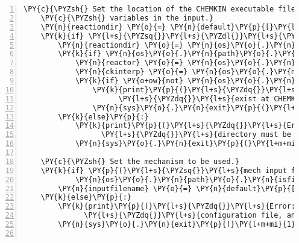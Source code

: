 \begin{Verbatim}[commandchars=\\\{\},fontsize=\small,numbers=left,firstnumber=1,stepnumber=2,firstline=2]
    \PY{c}{\PYZsh{} Set the location of the CHEMKIN executable files. Expand any shell}
    \PY{c}{\PYZsh{} variables in the input.}
    \PY{n}{reactiondir} \PY{o}{=} \PY{n}{default}\PY{p}{[}\PY{l+s}{\PYZsq{}}\PY{l+s}{chemkin root}\PY{l+s}{\PYZsq{}}\PY{p}{]}
    \PY{k}{if} \PY{l+s}{\PYZsq{}}\PY{l+s}{\PYZdl{}}\PY{l+s}{\PYZsq{}} \PY{o+ow}{in} \PY{n}{reactiondir}\PY{p}{:}
        \PY{n}{reactiondir} \PY{o}{=} \PY{n}{os}\PY{o}{.}\PY{n}{path}\PY{o}{.}\PY{n}{expandvars}\PY{p}{(}\PY{n}{reactiondir}\PY{p}{)}
        \PY{k}{if} \PY{n}{os}\PY{o}{.}\PY{n}{path}\PY{o}{.}\PY{n}{isdir}\PY{p}{(}\PY{n}{reactiondir}\PY{p}{)}\PY{p}{:}
            \PY{n}{reactor} \PY{o}{=} \PY{n}{os}\PY{o}{.}\PY{n}{path}\PY{o}{.}\PY{n}{join}\PY{p}{(}\PY{n}{reactiondir}\PY{p}{,}\PY{l+s}{\PYZsq{}}\PY{l+s}{bin}\PY{l+s}{\PYZsq{}}\PY{p}{,}\PY{l+s}{\PYZsq{}}\PY{l+s}{CKReactorGenericClosed}\PY{l+s}{\PYZsq{}}\PY{p}{)}
            \PY{n}{ckinterp} \PY{o}{=} \PY{n}{os}\PY{o}{.}\PY{n}{path}\PY{o}{.}\PY{n}{join}\PY{p}{(}\PY{n}{reactiondir}\PY{p}{,}\PY{l+s}{\PYZsq{}}\PY{l+s}{bin}\PY{l+s}{\PYZsq{}}\PY{p}{,}\PY{l+s}{\PYZsq{}}\PY{l+s}{chem}\PY{l+s}{\PYZsq{}}\PY{p}{)}
            \PY{k}{if} \PY{o+ow}{not} \PY{n}{os}\PY{o}{.}\PY{n}{path}\PY{o}{.}\PY{n}{isfile}\PY{p}{(}\PY{n}{reactor}\PY{p}{)} \PY{o+ow}{or} \PY{o+ow}{not} \PY{n}{os}\PY{o}{.}\PY{n}{path}\PY{o}{.}\PY{n}{isfile}\PY{p}{(}\PY{n}{ckinterp}\PY{p}{)}\PY{p}{:}
                \PY{k}{print}\PY{p}{(}\PY{l+s}{\PYZdq{}}\PY{l+s}{Error: The reactor and CHEMKIN interpreter must }\PY{l+s}{\PYZdq{}}
                      \PY{l+s}{\PYZdq{}}\PY{l+s}{exist at CHEMKIN\PYZus{}ROOT/bin/}\PY{l+s}{\PYZdq{}}\PY{p}{)}
                \PY{n}{sys}\PY{o}{.}\PY{n}{exit}\PY{p}{(}\PY{l+m+mi}{1}\PY{p}{)}
        \PY{k}{else}\PY{p}{:}
            \PY{k}{print}\PY{p}{(}\PY{l+s}{\PYZdq{}}\PY{l+s}{Error: The proper path to the CHEMKIN root }\PY{l+s}{\PYZdq{}}
                  \PY{l+s}{\PYZdq{}}\PY{l+s}{directory must be specified}\PY{l+s}{\PYZdq{}}\PY{p}{)}
            \PY{n}{sys}\PY{o}{.}\PY{n}{exit}\PY{p}{(}\PY{l+m+mi}{1}\PY{p}{)}

    \PY{c}{\PYZsh{} Set the mechanism to be used.}
    \PY{k}{if} \PY{p}{(}\PY{l+s}{\PYZsq{}}\PY{l+s}{mech input file}\PY{l+s}{\PYZsq{}} \PY{o+ow}{in} \PY{n}{default} \PY{o+ow}{and}
            \PY{n}{os}\PY{o}{.}\PY{n}{path}\PY{o}{.}\PY{n}{isfile}\PY{p}{(}\PY{n}{default}\PY{p}{[}\PY{l+s}{\PYZsq{}}\PY{l+s}{mech input file}\PY{l+s}{\PYZsq{}}\PY{p}{]}\PY{p}{)}\PY{p}{)}\PY{p}{:}
        \PY{n}{inputfilename} \PY{o}{=} \PY{n}{default}\PY{p}{[}\PY{l+s}{\PYZsq{}}\PY{l+s}{mech input file}\PY{l+s}{\PYZsq{}}\PY{p}{]}
    \PY{k}{else}\PY{p}{:}
        \PY{k}{print}\PY{p}{(}\PY{l+s}{\PYZdq{}}\PY{l+s}{Error: the mechanism file must be specified in the }\PY{l+s}{\PYZdq{}}
              \PY{l+s}{\PYZdq{}}\PY{l+s}{configuration file, and it must exist}\PY{l+s}{\PYZdq{}}\PY{p}{)}
        \PY{n}{sys}\PY{o}{.}\PY{n}{exit}\PY{p}{(}\PY{l+m+mi}{1}\PY{p}{)}


\end{Verbatim}
